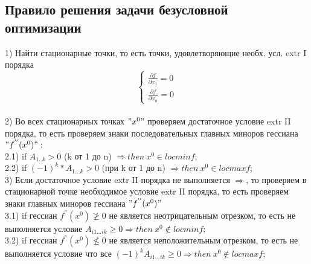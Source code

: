 \documentclass[a4paper]{article}
\begin{document}
\subsection*{Правило решения задачи безусловной оптимизации}
1) Найти стационарные точки, то есть точки, удовлетворяющие необх. усл. extr I порядка \\
$$
\begin{cases}
\frac{\partial f}{\partial x_1} = 0 \\
\frac{\partial f}{\partial x_n} = 0
\end{cases}
$$
\\
2) Во всех стационарных точках $"x^0"$ проверяем достаточное условие extr II порядка, то есть проверяем знаки последовательных главных миноров гессиана $"f^{''}(x^0)":$ \\
2.1) if $A_{1..k}>0$ (k от 1 до n) $\Rightarrow then \ x^0 \in locminf;$ \\
2.2) if $(-1)^k*A_{1...k} > 0$ (при k от 1 до n) $\Rightarrow then \ x^0 \in locmaxf;$ \\
3) Если достаточное условие extr II порядка не выполняется $\Rightarrow$, то проверяем в стационарной точке необходимое условие extr II порядка, то есть проверяем знаки главных миноров гессиана $"f^{''}(x^0)"$ \\
3.1) if гессиан $f^{''}(x^0) \ngeq 0$ не является неотрицательным отрезком, то есть не выполняется условие $A_{i1...ik} \geq 0 \Rightarrow then \ x^0 \notin locminf;$ \\
3.2) if гессиан $f^{''}(x^0) \nleq 0$ не является неположительным отрезком, то есть не выполняется условие что все $(-1)^{k}A_{i1...ik} \geq 0 \Rightarrow then \ x^0 \notin locmaxf;$ \\
\end{document}

